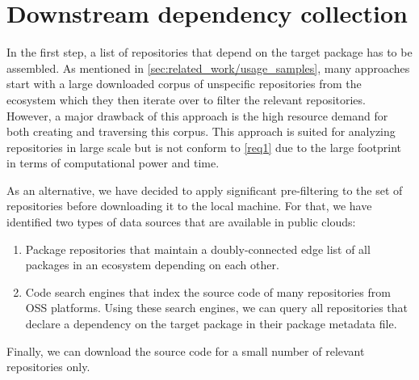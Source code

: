 \section{Downstream dependency collection}
\label{sec:dependency_collection}

In the first step, a list of repositories that depend on the target package has to be assembled.
As mentioned in \cref{sec:related_work/usage_samples}, many approaches start with a large downloaded corpus of unspecific repositories from the ecosystem which they then iterate over to filter the relevant repositories.
However, a major drawback of this approach is the high resource demand for both creating and traversing this corpus.
This approach is suited for analyzing repositories in large scale but is not conform to \cref{req1} due to the large footprint in terms of computational power and time.

As an alternative, we have decided to apply significant pre-filtering to the set of repositories before downloading it to the local machine.
For that, we have identified two types of data sources that are available in public clouds:

\begin{enumerate}[label=(\roman*)]
	\item Package repositories that maintain a doubly-connected edge list of all packages in an ecosystem depending on each other.
	\item Code search engines that index the source code of many repositories from OSS platforms.
		Using these search engines, we can query all repositories that declare a dependency on the target package in their package metadata file.
\end{enumerate}

Finally, we can download the source code for a small number of relevant repositories only.
